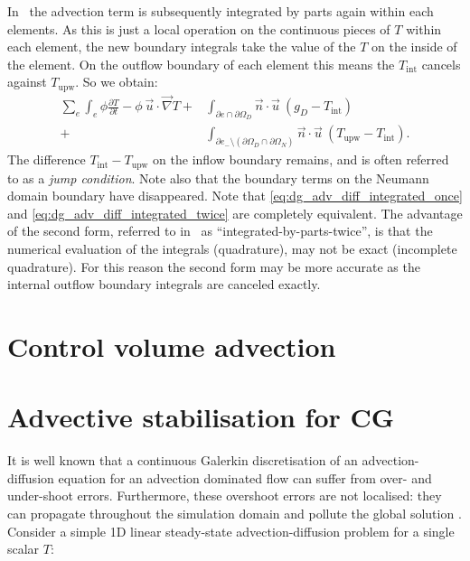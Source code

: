 In \fluidity\ the advection term is subsequently integrated by parts again within each elements. As 
this is just a local operation on the continuous pieces of $T$ within each element, 
the new boundary integrals take the value of the $T$ on the inside of the element. On the outflow 
boundary of each element this means the $T_{\mathrm{int}}$ cancels against 
$T_{\mathrm{upw}}$. So we obtain:
\begin{equation}
\begin{split}
  \sum_e \int_e \phi \frac{\partial T}{\partial t}
    - \phi~\vec{u}\cdot\vec{\nabla} T 
    +& \int_{\partial e \cap\partial\Omega_D} \vec{n}\cdot\vec{u}~(g_D -T_{\mathrm{int}}) \\
    +& \int_{\partial e_-\setminus (\partial\Omega_D\cap\partial\Omega_N)} \vec{n}\cdot\vec{u}~
      (T_{\mathrm{upw}}-T_{\mathrm{int}}).
    \label{eq:dg_adv_diff_integrated_twice}
\end{split}
\end{equation}
The difference $T_{\mathrm{int}}-T_{\mathrm{upw}}$ on the inflow boundary remains, and is often referred 
to as a \emph{jump condition}. Note also that the boundary terms on the Neumann domain boundary have
disappeared. Note that \eqref{eq:dg_adv_diff_integrated_once} and 
\eqref{eq:dg_adv_diff_integrated_twice} are completely equivalent. The advantage of the second form, 
referred to in \fluidity\ as ``integrated-by-parts-twice'', is that the numerical evaluation of the
integrals (quadrature), may not be exact (incomplete quadrature). For this reason the second form may be
more accurate as the internal outflow boundary integrals are canceled exactly.

\section{Control volume advection}


\section{Advective stabilisation for CG}
\label{Sect:ND_advective_stabilisation_CG}

It is well known that a continuous Galerkin discretisation of an
advection-diffusion equation for an advection dominated flow can suffer from
over- and under-shoot errors. Furthermore, these overshoot errors are not
localised: they can propagate throughout the simulation domain and pollute the
global solution \citep{hughes1987}. Consider a simple 1D linear steady-state
advection-diffusion problem for a single scalar $T$:

